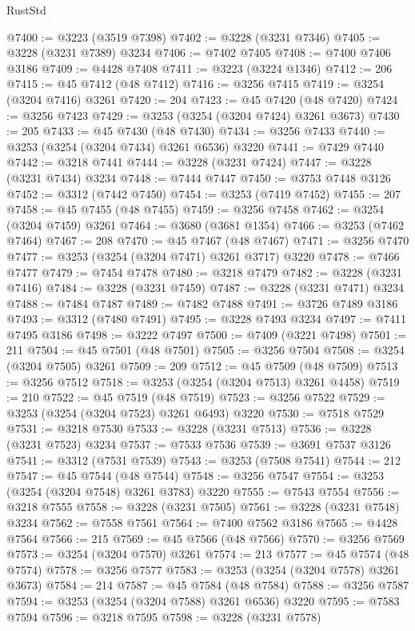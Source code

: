 \begin{lexlean}{RustStd}
\begin{coremodule}
{\begin{coremodule}
{{{{{{{{{{{{{{{{{{{{{{{{{{{{{{{{{{{{{@7400 := @3223 (@3519 @7398)
@7402 := @3228 (@3231 @7346)
@7405 := @3228 (@3231 @7389) @3234
@7406 := @7402 @7405
@7408 := @7400 @7406 @3186
@7409 := @4428 @7408
@7411 := @3223 (@3224 @1346)
@7412 := 206
@7415 := @45 @7412 (@48 @7412)
@7416 := @3256 @7415
@7419 := @3254 (@3204 @7416) @3261
@7420 := 204
@7423 := @45 @7420 (@48 @7420)
@7424 := @3256 @7423
@7429 := @3253 (@3254 (@3204 @7424) @3261 @3673)
@7430 := 205
@7433 := @45 @7430 (@48 @7430)
@7434 := @3256 @7433
@7440 := @3253 (@3254 (@3204 @7434) @3261 @6536) @3220
@7441 := @7429 @7440
@7442 := @3218 @7441
@7444 := @3228 (@3231 @7424)
@7447 := @3228 (@3231 @7434) @3234
@7448 := @7444 @7447
@7450 := @3753 @7448 @3126
@7452 := @3312 (@7442 @7450)
@7454 := @3253 (@7419 @7452)
@7455 := 207
@7458 := @45 @7455 (@48 @7455)
@7459 := @3256 @7458
@7462 := @3254 (@3204 @7459) @3261
@7464 := @3680 (@3681 @1354)
@7466 := @3253 (@7462 @7464)
@7467 := 208
@7470 := @45 @7467 (@48 @7467)
@7471 := @3256 @7470
@7477 := @3253 (@3254 (@3204 @7471) @3261 @3717) @3220
@7478 := @7466 @7477
@7479 := @7454 @7478
@7480 := @3218 @7479
@7482 := @3228 (@3231 @7416)
@7484 := @3228 (@3231 @7459)
@7487 := @3228 (@3231 @7471) @3234
@7488 := @7484 @7487
@7489 := @7482 @7488
@7491 := @3726 @7489 @3186
@7493 := @3312 (@7480 @7491)
@7495 := @3228 @7493 @3234
@7497 := @7411 @7495 @3186
@7498 := @3222 @7497
@7500 := @7409 (@3221 @7498)
@7501 := 211
@7504 := @45 @7501 (@48 @7501)
@7505 := @3256 @7504
@7508 := @3254 (@3204 @7505) @3261
@7509 := 209
@7512 := @45 @7509 (@48 @7509)
@7513 := @3256 @7512
@7518 := @3253 (@3254 (@3204 @7513) @3261 @4458)
@7519 := 210
@7522 := @45 @7519 (@48 @7519)
@7523 := @3256 @7522
@7529 := @3253 (@3254 (@3204 @7523) @3261 @6493) @3220
@7530 := @7518 @7529
@7531 := @3218 @7530
@7533 := @3228 (@3231 @7513)
@7536 := @3228 (@3231 @7523) @3234
@7537 := @7533 @7536
@7539 := @3691 @7537 @3126
@7541 := @3312 (@7531 @7539)
@7543 := @3253 (@7508 @7541)
@7544 := 212
@7547 := @45 @7544 (@48 @7544)
@7548 := @3256 @7547
@7554 := @3253 (@3254 (@3204 @7548) @3261 @3783) @3220
@7555 := @7543 @7554
@7556 := @3218 @7555
@7558 := @3228 (@3231 @7505)
@7561 := @3228 (@3231 @7548) @3234
@7562 := @7558 @7561
@7564 := @7400 @7562 @3186
@7565 := @4428 @7564
@7566 := 215
@7569 := @45 @7566 (@48 @7566)
@7570 := @3256 @7569
@7573 := @3254 (@3204 @7570) @3261
@7574 := 213
@7577 := @45 @7574 (@48 @7574)
@7578 := @3256 @7577
@7583 := @3253 (@3254 (@3204 @7578) @3261 @3673)
@7584 := 214
@7587 := @45 @7584 (@48 @7584)
@7588 := @3256 @7587
@7594 := @3253 (@3254 (@3204 @7588) @3261 @6536) @3220
@7595 := @7583 @7594
@7596 := @3218 @7595
@7598 := @3228 (@3231 @7578)
}}}}}}}}}}}}}}}}}}}}}}}}}}}}}}}}}}}}}
\end{coremodule}}
\end{coremodule}
\end{lexlean}

